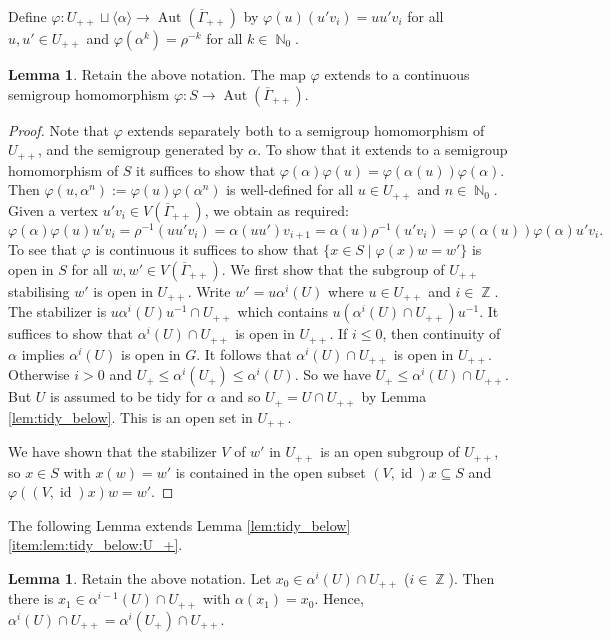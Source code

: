 \documentclass{article}
\DeclareMathOperator\Aut{Aut}
\DeclareMathOperator\id{id}
\DeclareMathOperator\bbN{\mathbb{N}}
\DeclareMathOperator\bbZ{\mathbb{Z}}
\theoremstyle{definition}
\newtheorem{lemma}[theorem]{Lemma}
\begin{document}
Define $\varphi: U_{++}\sqcup \langle \alpha \rangle \to \Aut(\overline{\Gamma}_{++})$ by $\varphi(u)(u'v_i)\! =\! uu'v_i$ for all $u,u'\in U_{++}$ and $\varphi(\alpha^{k}) = \rho^{-k}$ for all $k\in\bbN_{0}$.

\begin{lemma}\label{lem:tree_rep_cont}
Retain the above notation. The map $\varphi$ extends to a continuous semigroup homomorphism $\varphi:S\to\Aut(\overline{\Gamma}_{++})$. 
\end{lemma}

\begin{proof}
Note that $\varphi$ extends separately both to a semigroup homomorphism of $U_{++}$, and the semigroup generated by $\alpha$. To show that it extends to a semigroup homomorphism of $S$ it suffices to show that $\varphi(\alpha)\varphi(u) = \varphi(\alpha(u))\varphi(\alpha)$. Then $\varphi(u,\alpha^{n}):=\varphi(u)\varphi(\alpha^{n})$ is well-defined for all $u\in U_{++}$ and $n\in\bbN_0$. Given a vertex $u'v_{i}\in V(\overline{\Gamma}_{++})$, we obtain as required:
\[\varphi(\alpha)\varphi(u)u'v_{i} = \rho^{-1}(uu'v_{i}) = \alpha(uu')v_{i+1} = \alpha(u)\rho^{-1}(u'v_{i}) = \varphi(\alpha(u))\varphi(\alpha)u'v_{i}.\]
To see that $\varphi$ is continuous it suffices to show that $\{x\in S\mid \varphi(x)w = w'\}$ is open in $S$ for all $w,w'\in V(\overline{\Gamma}_{++})$. We first show that the subgroup of $U_{++}$ stabilising $w'$ is open in $U_{++}$. Write $w' = u\alpha^{i}(U)$ where $u\in U_{++}$ and $i\in\bbZ$. The stabilizer is $u\alpha^i(U)u^{-1}\cap U_{++}$ which contains $u(\alpha^i(U)\cap U_{++})u^{-1}$. It suffices to show that $\alpha^i(U)\cap U_{++}$ is open in $U_{++}$. If $i\le 0$, then continuity of $\alpha$ implies $\alpha^i(U)$ is open in $G$. It follows that $\alpha^i(U)\cap U_{++}$ is open in $U_{++}$. Otherwise $i > 0$ and $U_+\le \alpha^i(U_+)\le \alpha^i(U)$. So we have $U_+\le \alpha^i(U)\cap U_{++}$. But $U$ is assumed to be tidy for $\alpha$ and so $U_{+} = U\cap U_{++}$ by Lemma \ref{lem:tidy_below}. This is an open set in $U_{++}$.  

We have shown that the stabilizer $V$ of $w'$ in $U_{++}$ is an open subgroup of $U_{++}$, so $x\in S$ with $x(w) = w'$ is contained in the open subset $(V,\id)x\subseteq S$ and $\varphi((V,\id)x)w = w'$.

\end{proof}
The following Lemma extends Lemma \ref{lem:tidy_below}\ref{item:lem:tidy_below:U_+}.
\begin{lemma}\label{lem:precise_preimage}
Retain the above notation. Let $x_0\in \alpha^{i}(U)\cap U_{++}$ ($i\in\bbZ$). Then there is $x_1\in \alpha^{i-1}(U)\cap U_{++}$ with $\alpha(x_1) = x_0$.
Hence, $\alpha^{i}(U)\cap U_{++} = \alpha^{i}(U_+)\cap U_{++}$.
\end{lemma}
\end{document}
